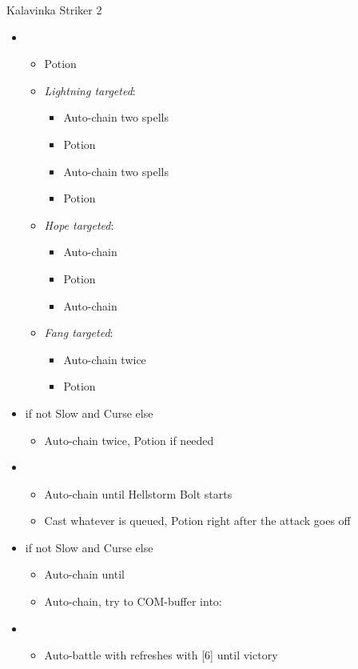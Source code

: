 \begin{battle}{Kalavinka Striker 2}
\begin{itemize}
    \item \first
    \begin{itemize}
        \item Potion
        \item \textit{Lightning targeted}:
        \begin{itemize}
            \item Auto-chain two spells
            \item Potion
            \item Auto-chain two spells
            \item Potion
        \end{itemize}
        \item \textit{Hope targeted}:
        \begin{itemize}
            \item Auto-chain
            \item Potion
            \item Auto-chain
        \end{itemize}
        \item \textit{Fang targeted}:
        \begin{itemize}
            \item Auto-chain twice
            \item Potion
        \end{itemize}
    \end{itemize}
    \item \second if not Slow and Curse else \fourth
    \begin{itemize}
        \item Auto-chain twice, Potion if needed
    \end{itemize}
    \item \third
    \begin{itemize}
        \item Auto-chain until Hellstorm Bolt starts
        \item Cast whatever is queued, Potion right after the attack goes off
    \end{itemize}
    \item \second if not Slow and Curse else \fourth
    \begin{itemize}
        \item Auto-chain until \stagger
        \item Auto-chain, try to COM-buffer into:
    \end{itemize}
    \item \fifth
    \begin{itemize}
        \item Auto-battle with refreshes with [6] until victory
    \end{itemize}
\end{itemize}
\end{battle}

